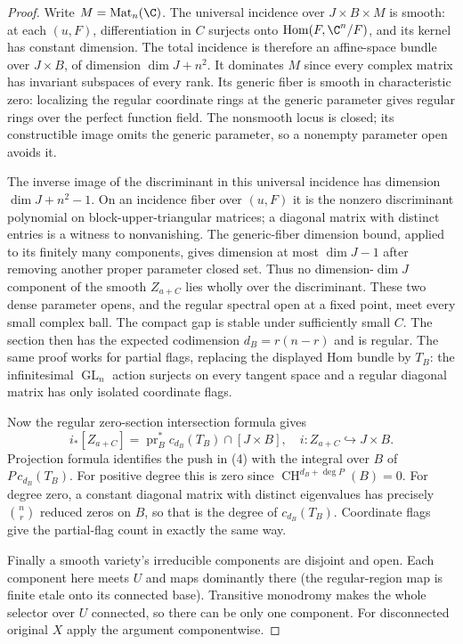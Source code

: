 \documentclass[11pt]{article}
\newcommand{\CH}{\operatorname{CH}}
\begin{document}
\begin{proof}
Write $M=\operatorname{Mat}_n(\C)$. The universal incidence over
$J\times B\times M$ is smooth: at each $(u,F)$, differentiation in $C$
surjects onto $\operatorname{Hom}(F,\C^n/F)$, and its kernel has constant
dimension. The total incidence is therefore an affine-space bundle over
$J\times B$, of dimension $\dim J+n^2$. It dominates $M$ since every
complex matrix has invariant subspaces of every rank. Its generic fiber
is smooth in characteristic zero: localizing the regular coordinate rings
at the generic parameter gives regular rings over the perfect function
field. The nonsmooth locus is closed; its constructible image omits the
generic parameter, so a nonempty parameter open avoids it.

The inverse image of the discriminant in this universal incidence has
dimension $\dim J+n^2-1$. On an incidence fiber over $(u,F)$ it is the
nonzero discriminant polynomial on block-upper-triangular matrices; a
diagonal matrix with distinct entries is a witness to nonvanishing.
The generic-fiber dimension bound, applied to its finitely many components,
gives dimension at most $\dim J-1$ after removing another proper parameter
closed set. Thus no dimension-$\dim J$ component of the smooth $Z_{a+C}$
lies wholly over the discriminant. These two dense parameter opens, and
the regular spectral open at a fixed point, meet every small complex ball.
The compact gap is stable under sufficiently small $C$. The section then
has the expected codimension $d_B=r(n-r)$ and is regular. The same proof
works for partial flags, replacing the displayed Hom bundle by $T_B$:
the infinitesimal $\operatorname{GL}_n$ action surjects on every tangent
space and a regular diagonal matrix has only isolated coordinate flags.

Now the regular zero-section intersection formula gives
\[
 i_*[Z_{a+C}]=\operatorname{pr}_B^*c_{d_B}(T_B)\cap[J\times B],
 \quad i:Z_{a+C}\hookrightarrow J\times B.
\]
Projection formula identifies the push in (4) with the integral over $B$
of $P\,c_{d_B}(T_B)$. For positive degree this is zero since
$\CH^{d_B+\deg P}(B)=0$. For degree zero, a constant diagonal matrix
with distinct eigenvalues has precisely $\binom nr$ reduced zeros on $B$,
so that is the degree of $c_{d_B}(T_B)$. Coordinate flags give the
partial-flag count in exactly the same way.

Finally a smooth variety's irreducible components are disjoint and open.
Each component here meets $U$ and maps dominantly there (the regular-region
map is finite etale onto its connected base). Transitive monodromy makes
the whole selector over $U$ connected, so there can be only one component.
For disconnected original $X$ apply the argument componentwise.
\end{proof}
\end{document}
